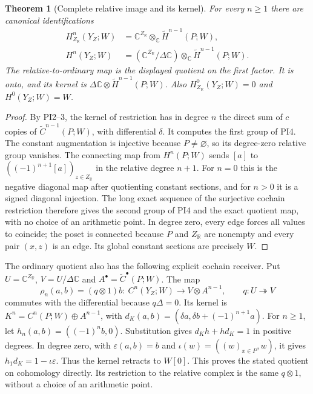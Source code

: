 \documentclass[11pt,a4paper]{article}
\newtheorem{theorem}{Theorem}[section]
\theoremstyle{definition}\newtheorem{definition}[theorem]{Definition}
\newcommand{\C}{\mathbb C}\newcommand{\R}{\mathbb R}
\begin{document}
\begin{theorem}[Complete relative image and its kernel]
For every $n\ge1$ there are canonical identifications
\[
 \begin{aligned}
 H^n_{Z_\R}(Y_Z;W)&=\C^{Z_\R}\otimes_\C
                         \widetilde H^{n-1}(P;W),\\
 H^n(Y_Z;W)&=(\C^{Z_\R}/\Delta\C)\otimes_\C
                         \widetilde H^{n-1}(P;W).
 \end{aligned}
 \tag{PI4}\label{pi:groups}
\]
The relative-to-ordinary map is the displayed quotient on the
first factor. It is onto, and its kernel is
$\Delta\C\otimes\widetilde H^{n-1}(P;W)$.
Also $H^0_{Z_\R}(Y_Z;W)=0$ and $H^0(Y_Z;W)=W$.
\end{theorem}
\begin{proof}
By PI2--3, the kernel of restriction has in degree $n$ the
direct sum of $c$ copies of $\widetilde C^{n-1}(P;W)$, with
differential $\delta$. It computes the first group of PI4.
The constant augmentation is injective because $P\ne\varnothing$,
so its degree-zero relative group vanishes. The connecting map
from $H^n(P;W)$ sends $[a]$ to
$((-1)^{n+1}[a])_{z\in Z_\R}$ in the relative degree $n+1$.
For $n=0$ this is the negative diagonal map after quotienting constant
sections, and for $n>0$ it is a signed diagonal injection.
The long exact sequence of the surjective cochain restriction
therefore gives the second group of PI4 and the exact quotient
map, with no choice of an arithmetic point. In degree zero,
every edge forces all values to coincide; the poset is connected
because $P$ and $Z_\R$ are nonempty and every pair $(x,z)$ is an
edge. Its global constant sections are precisely $W$.
\end{proof}

The ordinary quotient also has the following explicit cochain
receiver. Put $U=\C^{Z_\R}$, $V=U/\Delta\C$ and
$A^\bullet=\widetilde C^\bullet(P;W)$. The map
\[
 \rho_n(a,b)=(q\otimes1)b:\ C^n(Y_Z;W)\longrightarrow
                      V\otimes A^{n-1},\qquad q:U\twoheadrightarrow V
 \tag{PI7}\label{pi:cochain-quotient}
\]
commutes with the differential because $q\Delta=0$. Its kernel
is $K^n=C^n(P;W)\oplus A^{n-1}$, with
$d_K(a,b)=(\delta a,\delta b+(-1)^{n+1}a)$.
For $n\ge1$, let $h_n(a,b)=((-1)^n b,0)$.
Substitution gives $d_Kh+hd_K=1$ in positive degrees.
In degree zero, with $\varepsilon(a,b)=b$ and
$\iota(w)=((w)_{x\in P},w)$, it gives
$h_1d_K=1-\iota\varepsilon$. Thus the kernel retracts to
$W[0]$. This proves the stated quotient on cohomology directly.
Its restriction to the relative complex is the same $q\otimes1$,
without a choice of an arithmetic point.
\end{document}
